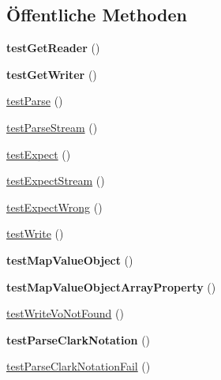\subsection*{Öffentliche Methoden}
\begin{DoxyCompactItemize}
\item 
\mbox{\label{class_sabre_1_1_xml_1_1_service_test_ae924129385f3853611984bf8e2c4006a}} 
{\bfseries test\+Get\+Reader} ()
\item 
\mbox{\label{class_sabre_1_1_xml_1_1_service_test_a0670b58065d9b5d55624ce8b2bf603a9}} 
{\bfseries test\+Get\+Writer} ()
\item 
\mbox{\hyperlink{class_sabre_1_1_xml_1_1_service_test_a156de8532fb7d1b730008b9405c52f88}{test\+Parse}} ()
\item 
\mbox{\hyperlink{class_sabre_1_1_xml_1_1_service_test_a7bdfb70b67f6ffcbe1a554d1509b5843}{test\+Parse\+Stream}} ()
\item 
\mbox{\hyperlink{class_sabre_1_1_xml_1_1_service_test_a2a9439b7962f8e4bdd266bbd22efc415}{test\+Expect}} ()
\item 
\mbox{\hyperlink{class_sabre_1_1_xml_1_1_service_test_ad88a945b5948ffdeb32897709471c284}{test\+Expect\+Stream}} ()
\item 
\mbox{\hyperlink{class_sabre_1_1_xml_1_1_service_test_a588b789da63be574e833d70b9351d692}{test\+Expect\+Wrong}} ()
\item 
\mbox{\hyperlink{class_sabre_1_1_xml_1_1_service_test_aef5fdaf58ddd284ab3adef59edc8cd84}{test\+Write}} ()
\item 
\mbox{\label{class_sabre_1_1_xml_1_1_service_test_aa679cc3cd0ca3cb3b60febcccb2cf0e2}} 
{\bfseries test\+Map\+Value\+Object} ()
\item 
\mbox{\label{class_sabre_1_1_xml_1_1_service_test_aaf353d819238b91e1b84954bea7b1c17}} 
{\bfseries test\+Map\+Value\+Object\+Array\+Property} ()
\item 
\mbox{\hyperlink{class_sabre_1_1_xml_1_1_service_test_ac91805423e8067824379f13359dffa94}{test\+Write\+Vo\+Not\+Found}} ()
\item 
\mbox{\label{class_sabre_1_1_xml_1_1_service_test_ac7cc3de80bc5479856332602fd4b14f5}} 
{\bfseries test\+Parse\+Clark\+Notation} ()
\item 
\mbox{\hyperlink{class_sabre_1_1_xml_1_1_service_test_a6a1597d2e834eb64422968e8f290370c}{test\+Parse\+Clark\+Notation\+Fail}} ()
\end{DoxyCompactItemize}


